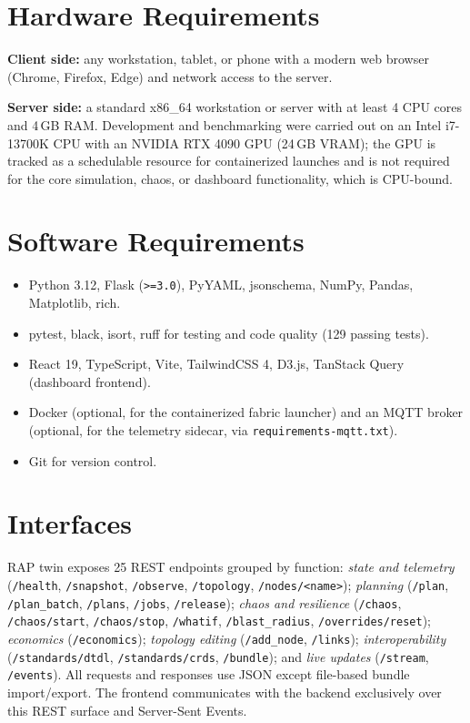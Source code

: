 \documentclass[12pt,a4]{report}
\begin{document}
\section{Hardware Requirements}

\textbf{Client side:} any workstation, tablet, or phone with a modern web browser (Chrome, Firefox, Edge) and network access to the server.

\textbf{Server side:} a standard x86\_64 workstation or server with at least 4 CPU cores and 4\,GB RAM. Development and benchmarking were carried out on an Intel i7-13700K CPU with an NVIDIA RTX 4090 GPU (24\,GB VRAM); the GPU is tracked as a schedulable resource for containerized launches and is not required for the core simulation, chaos, or dashboard functionality, which is CPU-bound.

\section{Software Requirements}

\begin{itemize}
    \item Python 3.12, Flask (\texttt{>=3.0}), PyYAML, jsonschema, NumPy, Pandas, Matplotlib, rich.
    \item pytest, black, isort, ruff for testing and code quality (129 passing tests).
    \item React 19, TypeScript, Vite, TailwindCSS 4, D3.js, TanStack Query (dashboard frontend).
    \item Docker (optional, for the containerized fabric launcher) and an MQTT broker (optional, for the telemetry sidecar, via \texttt{requirements-mqtt.txt}).
    \item Git for version control.
\end{itemize}

\section{Interfaces}

RAP twin exposes 25 REST endpoints grouped by function: \textit{state and telemetry} (\texttt{/health}, \texttt{/snapshot}, \texttt{/observe}, \texttt{/topology}, \texttt{/nodes/<name>}); \textit{planning} (\texttt{/plan}, \texttt{/plan\_batch}, \texttt{/plans}, \texttt{/jobs}, \texttt{/release}); \textit{chaos and resilience} (\texttt{/chaos}, \texttt{/chaos/start}, \texttt{/chaos/stop}, \texttt{/whatif}, \texttt{/blast\_radius}, \texttt{/overrides/reset}); \textit{economics} (\texttt{/economics}); \textit{topology editing} (\texttt{/add\_node}, \texttt{/links}); \textit{interoperability} (\texttt{/standards/dtdl}, \texttt{/standards/crds}, \texttt{/bundle}); and \textit{live updates} (\texttt{/stream}, \texttt{/events}). All requests and responses use JSON except file-based bundle import/export. The frontend communicates with the backend exclusively over this REST surface and Server-Sent Events.
\end{document}
